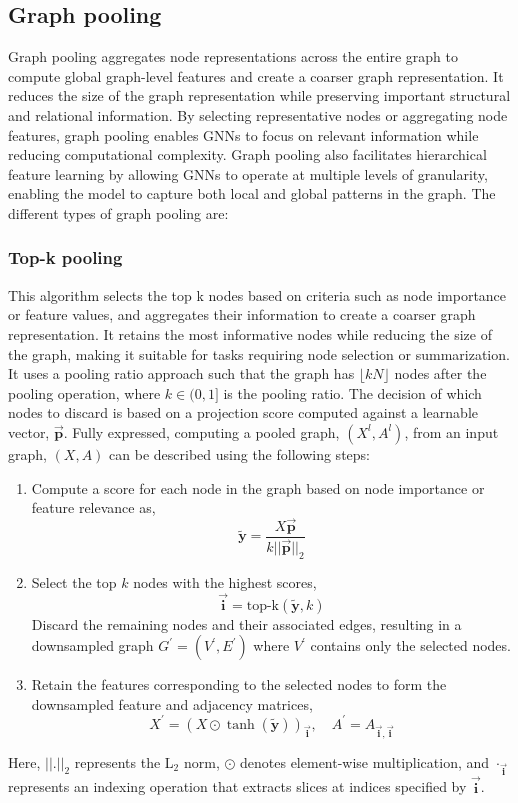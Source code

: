 \subsection{Graph pooling}
Graph pooling aggregates node representations across the entire graph to compute global graph-level features and create a coarser graph representation. It reduces the size of the graph representation while preserving important structural and relational information. By selecting representative nodes or aggregating node features, graph pooling enables GNNs to focus on relevant information while reducing computational complexity. Graph pooling also facilitates hierarchical feature learning by allowing GNNs to operate at multiple levels of granularity, enabling the model to capture both local and global patterns in the graph. The different types of graph pooling are:
\subsubsection{Top-k pooling} 
This algorithm selects the top k nodes based on criteria such as node importance or feature values, and aggregates their information to create a coarser graph representation. It retains the most informative nodes while reducing the size of the graph, making it suitable for tasks requiring node selection or summarization. It uses a pooling ratio approach such that the graph has $\lfloor kN \rfloor$ nodes after the pooling operation, where $k \in (0, 1]$ is the pooling ratio. The decision of which nodes to discard is based on a projection score computed against a learnable vector, $\mathbf{\overrightarrow{p}}$. Fully expressed, computing a pooled graph, $(X^l, A^l)$, from an input graph, $(X, A)$ can be described using the following steps: 
\begin{enumerate}
    \item Compute a score for each node in the graph based on node importance or feature relevance as,
    \[
\mathbf{\tilde{y}} = \frac{X \mathbf{\overrightarrow{p}}}{k||\mathbf{\overrightarrow{p}}||_2} \]
    \item Select the top $k$ nodes with the highest scores, \[ \mathbf{\overrightarrow{i}} = \text{top-k}(\mathbf{\tilde{y}}, k) \]
    Discard the remaining nodes and their associated edges, resulting in a downsampled graph $G^{\prime} = (V^{\prime}, E^{\prime})$ where $V^{\prime}$ contains only the selected nodes.
    \item Retain the features corresponding to the selected nodes to form the downsampled feature and adjacency matrices, \[
        X^{\prime} = (X \odot \tanh(\mathbf{\tilde{y}}))_{\mathbf{\overrightarrow{i}}}, \quad A^{\prime} = A_{\mathbf{\overrightarrow{i}},\mathbf{\overrightarrow{i}}}
       \]
\end{enumerate}
Here, $||.||_2$ represents the L$_2$ norm, $\odot$ denotes element-wise multiplication, and $\cdot_{\mathbf{\overrightarrow{i}}}$ represents an indexing operation that extracts slices at indices specified by $\mathbf{\overrightarrow{i}}$. 

